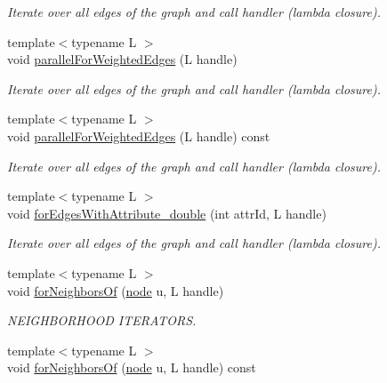 \begin{DoxyCompactItemize}
\begin{DoxyCompactList}\small\item\em Iterate over all edges of the graph and call handler (lambda closure). \end{DoxyCompactList}\item 
{\footnotesize template$<$typename L $>$ }\\void \hyperlink{class_networ_kit_1_1_graph_ab015dda7fdcfe35c2b61473c47f76348}{parallel\-For\-Weighted\-Edges} (L handle)
\begin{DoxyCompactList}\small\item\em Iterate over all edges of the graph and call handler (lambda closure). \end{DoxyCompactList}\item 
{\footnotesize template$<$typename L $>$ }\\void \hyperlink{class_networ_kit_1_1_graph_a517abe475e68e421037a99fe2945f96a}{parallel\-For\-Weighted\-Edges} (L handle) const 
\begin{DoxyCompactList}\small\item\em Iterate over all edges of the graph and call handler (lambda closure). \end{DoxyCompactList}\item 
{\footnotesize template$<$typename L $>$ }\\void \hyperlink{class_networ_kit_1_1_graph_aaa1d8ce38bb9d2603ea2426f920699d6}{for\-Edges\-With\-Attribute\-\_\-double} (int attr\-Id, L handle)
\begin{DoxyCompactList}\small\item\em Iterate over all edges of the graph and call handler (lambda closure). \end{DoxyCompactList}\item 
{\footnotesize template$<$typename L $>$ }\\void \hyperlink{class_networ_kit_1_1_graph_a7b0d575c9fa66d075bd6d81c1593f081}{for\-Neighbors\-Of} (\hyperlink{namespace_networ_kit_a61914158fd771265be48de9942369160}{node} u, L handle)
\begin{DoxyCompactList}\small\item\em N\-E\-I\-G\-H\-B\-O\-R\-H\-O\-O\-D I\-T\-E\-R\-A\-T\-O\-R\-S. \end{DoxyCompactList}\item 
{\footnotesize template$<$typename L $>$ }\\void \hyperlink{class_networ_kit_1_1_graph_a87e7e61da8108f72de37893f8a2a7c4d}{for\-Neighbors\-Of} (\hyperlink{namespace_networ_kit_a61914158fd771265be48de9942369160}{node} u, L handle) const 

\end{DoxyCompactItemize}
